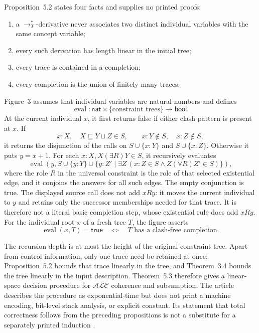 Proposition~5.2 states four facts and supplies no printed proofs:
\begin{enumerate}
\item a \(\to_T^*\)-derivative never associates two distinct individual
      variables with the same concept variable;
\item every such derivation has length linear in the initial tree;
\item every trace is contained in a completion;
\item every completion is the union of finitely many traces.
\end{enumerate}
Figure~3 assumes that individual variables are natural numbers and defines
\[
 \operatorname{eval}:
 \mathsf{nat}\times\{\text{constraint trees}\}\longrightarrow\mathsf{bool}.
\]
At the current individual \(x\), it first returns false if either clash pattern
is present at \(x\).  If
\[
 x:X,\quad X\sqsubseteq Y\sqcup Z\in S,
 \qquad x:Y\notin S,\quad x:Z\notin S,
\]
it returns the disjunction of the calls on
\(S\cup\{x:Y\}\) and \(S\cup\{x:Z\}\).  Otherwise it puts \(y=x+1\).  For
each \(x:X,X(\exists R)Y\in S\), it recursively evaluates
\[
 \operatorname{eval}\!\left(
  y,
  S\cup\{y:Y\}\cup
  \{y:Z'\mid \exists Z\,(x:Z\in S\land Z(\forall R)Z'\in S)\}
 \right),
\]
where the role \(R\) in the universal constraint is the role of that selected
existential edge, and it conjoins the answers for all such edges.  The empty
conjunction is true.  The displayed source call does not add \(xRy\): it moves
the current individual to \(y\) and retains only the successor memberships
needed for that trace.  It is therefore not a literal basic completion step,
whose existential rule does add \(xRy\).  For the individual root \(x\) of a
fresh tree \(T\), the figure asserts
\[
 \operatorname{eval}(x,T)=\mathsf{true}
 \quad\Longleftrightarrow\quad
 T\text{ has a clash-free completion}.
\]

The recursion depth is at most the height of the original constraint tree.
Apart from control information, only one trace need be retained at once;
Proposition~5.2 bounds that trace linearly in the tree, and Theorem~3.4 bounds
the tree linearly in the input description.  Theorem~5.3 therefore gives a
linear-space decision procedure for \(\mathcal{ALC}\) coherence and
subsumption.  The article describes the procedure as exponential-time but
does not print a machine encoding, bit-level stack analysis, or explicit
constant.  Its statement that total correctness follows from the preceding
propositions is not a substitute for a separately printed induction
\cite[Fig.~3 and Thm.~5.3, p.~15]{SchmidtSchaussSmolka1991}.


